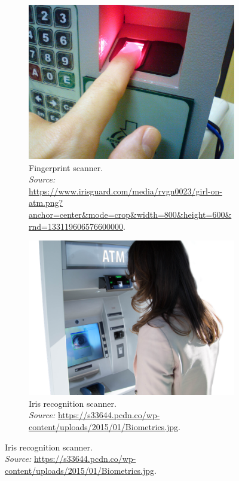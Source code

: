 \documentclass[12pt]{report}
\begin{document}
\begin{figure}[htbp]
    \centering
    \begin{subfigure}[t]{0.45\textwidth}
        \centering
        \includegraphics[width=\linewidth]{Images/Theory/Fingerprint_scanner_identification.jpg}
        \captionsetup{justification=raggedright, singlelinecheck=false, font=small}
        \caption{Fingerprint scanner.\\
        \textit{Source:} \url{https://www.irisguard.com/media/rvgn0023/girl-on-atm.png?anchor=center&mode=crop&width=800&height=600&rnd=133119606576600000}.}
        \label{fig:scanner_fingerprint}
    \end{subfigure}
    \hfill
    \begin{subfigure}[t]{0.45\textwidth}
        \centering
        \includegraphics[width=\linewidth]{Images/Theory/eye.png}
        \captionsetup{justification=raggedright, singlelinecheck=false, font=small}
        \caption{Iris recognition scanner.\\
        \textit{Source:} \url{https://s33644.pcdn.co/wp-content/uploads/2015/01/Biometrics.jpg}.}
        \label{fig:scanner_eye}
    \end{subfigure}


\end{figure}
\end{document}
